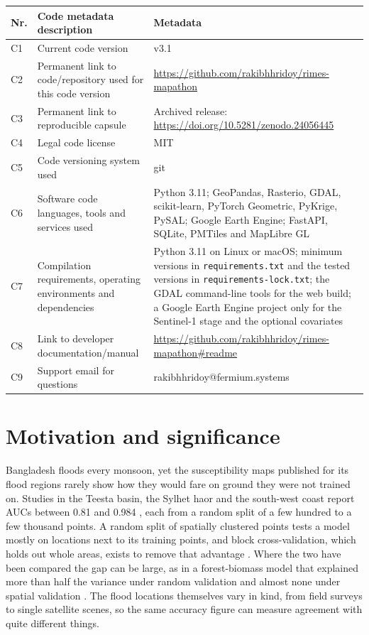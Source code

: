 \documentclass[preprint,12pt]{elsarticle}
\newcommand{\SoftwareDOI}{\url{https://doi.org/10.5281/zenodo.24056445}}
\begin{document}
\begin{table}[H]
\small
\begin{tabularx}{\linewidth}{@{}l>{\raggedright\arraybackslash}p{5.2cm}>{\raggedright\arraybackslash}X@{}}
\toprule
Nr. & Code metadata description & Metadata \\
\midrule
C1 & Current code version & v3.1 \\
C2 & Permanent link to code/repository used for this code version & \url{https://github.com/rakibhhridoy/rimes-mapathon} \\
C3 & Permanent link to reproducible capsule & Archived release: \SoftwareDOI{} \\
C4 & Legal code license & MIT \\
C5 & Code versioning system used & git \\
C6 & Software code languages, tools and services used & Python 3.11; GeoPandas, Rasterio, GDAL, scikit-learn, PyTorch Geometric, PyKrige, PySAL; Google Earth Engine; FastAPI, SQLite, PMTiles and MapLibre GL \\
C7 & Compilation requirements, operating environments and dependencies & Python 3.11 on Linux or macOS; minimum versions in \texttt{requirements.txt} and the tested versions in \texttt{requirements-lock.txt}; the GDAL command-line tools for the web build; a Google Earth Engine project only for the Sentinel-1 stage and the optional covariates \\
C8 & Link to developer documentation/manual & \url{https://github.com/rakibhhridoy/rimes-mapathon\#readme} \\
C9 & Support email for questions & rakibhhridoy@fermium.systems \\
\bottomrule
\end{tabularx}
\end{table}

\section{Motivation and significance}
\label{sec:motivation}

Bangladesh floods every monsoon, yet the susceptibility maps published for its flood regions rarely show how they would fare on ground they were not trained on. Studies in the Teesta basin, the Sylhet haor and the south-west coast report AUCs between 0.81 and 0.984 \citep{islam2021, talukdar2020, islamr2024, adnan2023}, each from a random split of a few hundred to a few thousand points. A random split of spatially clustered points tests a model mostly on locations next to its training points, and block cross-validation, which holds out whole areas, exists to remove that advantage \citep{roberts2017}. Where the two have been compared the gap can be large, as in a forest-biomass model that explained more than half the variance under random validation and almost none under spatial validation \citep{ploton2020}. The flood locations themselves vary in kind, from field surveys to single satellite scenes, so the same accuracy figure can measure agreement with quite different things.
\end{document}
